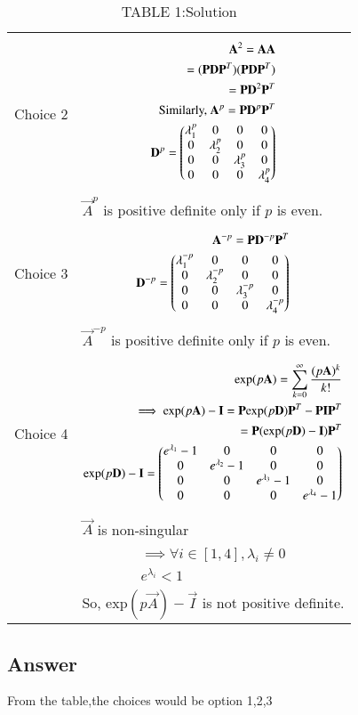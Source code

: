 \documentclass[journal,12pt,twocolumn]{IEEEtran}
\begin{document}
\begin{table*}[!t]
\begin{tabular}{|l|l|}
      \hline
      Choice 2 & 
       \parbox{12cm}{\begin{align}
          \mathbf{A}^2=\mathbf{A}\mathbf{A}\\
    =(\mathbf{P}\mathbf{D}\mathbf{P}^T)(\mathbf{P}\mathbf{D}\mathbf{P}^T)\\
    =\mathbf{P}\mathbf{D}^2\mathbf{P}^T\\
    \text{Similarly, }\mathbf{A}^p=\mathbf{P}\mathbf{D}^p\mathbf{P}^T\\
    \mathbf{D}^p=\begin{pmatrix}\lambda_1^p&0&0&0\\0&\lambda_2^p&0&0\\0&0&\lambda_3^p&0\\0&0&0&\lambda_4^p\end{pmatrix}
       \end{align}}\\
       & $\vec{A}^{p}$ is positive definite only if $p$ is even.\\
       \hline
      Choice 3& 
        \parbox{12cm}{\begin{align}
           \mathbf{A}^{-p}=\mathbf{P}\mathbf{D}^{-p}\mathbf{P}^T\\
    \mathbf{D}^{-p}=\begin{pmatrix}\lambda_1^{-p}&0&0&0\\0&\lambda_2^{-p}&0&0\\0&0&\lambda_3^{-p}&0\\0&0&0&\lambda_4^{-p}\end{pmatrix}
       \end{align}}\\
       & $\vec{A}^{-p}$ is positive definite only if $p$ is even.\\
       \hline
      Choice 4 &
        \parbox{12cm}{\begin{align}
          \text{exp}(p\mathbf{A})=\sum_{k=0}^\infty \frac{(p\mathbf{A})^k}{k!}\\
     \implies  \text{exp}(p\mathbf{A})-\mathbf{I}=\mathbf{P} \text{exp}(p\mathbf{D})\mathbf{P}^T-\mathbf{P}\mathbf{I}\mathbf{P}^T\\
     =\mathbf{P}( \text{exp}(p\mathbf{D})-\mathbf{I}) \mathbf{P}^T\\
     \text{exp}(p\mathbf{D})-\mathbf{I}=\begin{pmatrix}e^{\lambda_1}-1&0&0&0\\0&e^{\lambda_2}-1&0&0\\0&0&e^{\lambda_3}-1&0\\0&0&0&e^{\lambda_4}-1\end{pmatrix}
       \end{align}}\\
       & $\vec{A}$ is non-singular\\
        & \parbox{12cm}{\begin{align}
   \implies \forall i \in [1,4], \lambda_i\neq0\\
   e^{\lambda_i}<1
\end{align}}\\
 & So, exp$(p\vec{A})-\vec{I}$ is not positive definite.\\
       \hline
    \end{tabular}
    \caption*{TABLE 1:Solution}
\end{table*}
\subsection{Answer}
 From the table,the choices would be option 1,2,3
\end{document}
